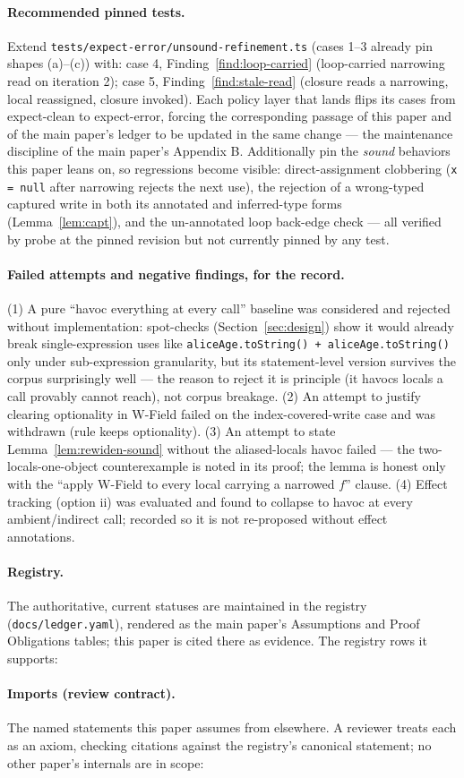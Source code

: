 \documentclass[11pt]{article}
\begin{document}
\paragraph{Recommended pinned tests.}
Extend \texttt{tests/expect-error/unsound-refinement.ts} (cases 1--3
already pin shapes (a)--(c)) with:
case 4, Finding~\ref{find:loop-carried} (loop-carried narrowing read on
iteration 2); case 5, Finding~\ref{find:stale-read} (closure reads a
narrowing, local reassigned, closure invoked). Each policy layer that
lands flips its cases from expect-clean to expect-error, forcing the
corresponding passage of this paper and of the main paper's ledger to be
updated in the same change — the maintenance discipline of the main
paper's Appendix B. Additionally pin the \emph{sound} behaviors this
paper leans on, so regressions become visible: direct-assignment clobbering
(\texttt{x = null} after narrowing rejects the next use), the rejection
of a wrong-typed captured write in both its annotated and inferred-type
forms (Lemma~\ref{lem:capt}), and the un-annotated loop back-edge check
— all verified by probe at the pinned revision but not currently pinned
by any test.

\paragraph{Failed attempts and negative findings, for the record.}
(1) A pure ``havoc everything at every call'' baseline was considered and
rejected without implementation: spot-checks (Section~\ref{sec:design})
show it would already break single-expression uses like
\texttt{aliceAge.toString() + aliceAge.toString()} only under
sub-expression granularity, but its statement-level version survives the
corpus surprisingly well — the reason to reject it is principle (it
havocs locals a call provably cannot reach), not corpus breakage.
(2) An attempt to justify clearing optionality in W-Field failed on the
index-covered-write case and was withdrawn (rule keeps optionality).
(3) An attempt to state Lemma~\ref{lem:rewiden-sound} without the
aliased-locals havoc failed — the two-locals-one-object counterexample is
noted in its proof; the lemma is honest only with the ``apply W-Field to
every local carrying a narrowed $f$'' clause.
(4) Effect tracking (option ii) was evaluated and found to collapse to
havoc at every ambient/indirect call; recorded so it is not re-proposed
without effect annotations.

\paragraph{Registry.}
The authoritative, current statuses are maintained in the registry
(\texttt{docs/ledger.yaml}), rendered as the main paper's Assumptions and
Proof Obligations tables; this paper is cited there as evidence. The
registry rows it supports:



\paragraph{Imports (review contract).}
The named statements this paper assumes from elsewhere. A reviewer treats
each as an axiom, checking citations against the registry's canonical
statement; no other paper's internals are in scope:


\end{document}
